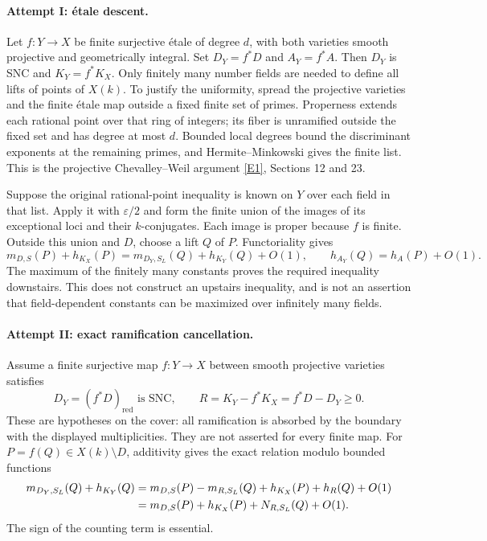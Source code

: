 \documentclass[11pt,a4paper]{article}
\newcommand{\eps}{\varepsilon}
\newcommand{\eref}[2]{\hyperlink{extra:#1:#2}{[E#2]}}
\numberwithin{equation}{section}
\begin{document}
\paragraph{Attempt I: étale descent.}
Let $f:Y\to X$ be finite surjective étale of degree $d$, with both varieties smooth projective and geometrically integral. Set $D_Y=f^*D$ and $A_Y=f^*A$. Then $D_Y$ is SNC and $K_Y=f^*K_X$. Only finitely many number fields are needed to define all lifts of points of $X(k)$. To justify the uniformity, spread the projective varieties and the finite étale map outside a fixed finite set of primes. Properness extends each rational point over that ring of integers; its fiber is unramified outside the fixed set and has degree at most $d$. Bounded local degrees bound the discriminant exponents at the remaining primes, and Hermite--Minkowski gives the finite list. This is the projective Chevalley--Weil argument \eref{64}{1}, Sections 12 and 23.

Suppose the original rational-point inequality is known on $Y$ over each field in that list. Apply it with $\eps/2$ and form the finite union of the images of its exceptional loci and their $k$-conjugates. Each image is proper because $f$ is finite. Outside this union and $D$, choose a lift $Q$ of $P$. Functoriality gives
\[
 m_{D,S}(P)+h_{K_X}(P)
 =m_{D_Y,S_L}(Q)+h_{K_Y}(Q)+O(1),\qquad
 h_{A_Y}(Q)=h_A(P)+O(1).
\]
The maximum of the finitely many constants proves the required inequality downstairs. This does not construct an upstairs inequality, and is not an assertion that field-dependent constants can be maximized over infinitely many fields.

\paragraph{Attempt II: exact ramification cancellation.}
Assume a finite surjective map $f:Y\to X$ between smooth projective varieties satisfies
\begin{equation}\label{r64:cover}
 D_Y=(f^*D)_{\mathrm{red}}\text{ is SNC},\qquad
 R=K_Y-f^*K_X=f^*D-D_Y\ge0.
\end{equation}
These are hypotheses on the cover: all ramification is absorbed by the boundary with the displayed multiplicities. They are not asserted for every finite map. For $P=f(Q)\in X(k)\setminus D$, additivity gives the exact relation modulo bounded functions
\begin{align}
 m_{D_Y,S_L}(Q)+h_{K_Y}(Q)
 &=m_{D,S}(P)-m_{R,S_L}(Q)+h_{K_X}(P)+h_R(Q)+O(1)\notag\\
 &=m_{D,S}(P)+h_{K_X}(P)+N_{R,S_L}(Q)+O(1).
 \label{r64:identity}
\end{align}
The sign of the counting term is essential.
\end{document}
